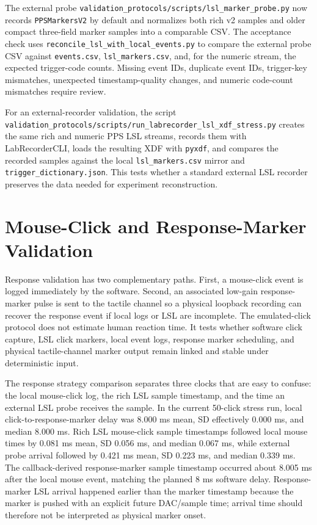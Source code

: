 \documentclass[11pt]{article}
\begin{document}
The external probe
\texttt{validation\_protocols/scripts/lsl\_marker\_probe.py} now records
\texttt{PPSMarkersV2} by default and normalizes both rich v2 samples and older
compact three-field marker samples into a comparable CSV. The acceptance check
uses \texttt{reconcile\_lsl\_with\_local\_events.py} to compare the external
probe CSV against \texttt{events.csv}, \texttt{lsl\_markers.csv}, and, for the
numeric stream, the expected trigger-code counts. Missing event IDs, duplicate
event IDs, trigger-key mismatches, unexpected timestamp-quality changes, and
numeric code-count mismatches require review.

For an external-recorder validation, the script
\texttt{validation\_protocols/scripts/run\_labrecorder\_lsl\_xdf\_stress.py}
creates the same rich and numeric PPS LSL streams, records them with
LabRecorderCLI, loads the resulting XDF with \texttt{pyxdf}, and compares the
recorded samples against the local \texttt{lsl\_markers.csv} mirror and
\texttt{trigger\_dictionary.json}. This tests whether a standard external LSL
recorder preserves the data needed for experiment reconstruction.

\section{Mouse-Click and Response-Marker Validation}

Response validation has two complementary paths. First, a mouse-click event is
logged immediately by the software. Second, an associated low-gain
response-marker pulse is sent to the tactile channel so a physical loopback
recording can recover the response event if local logs or LSL are incomplete.
The emulated-click protocol does not estimate human reaction time. It tests
whether software click capture, LSL click markers, local event logs, response
marker scheduling, and physical tactile-channel marker output remain linked
and stable under deterministic input.

The response strategy comparison separates three clocks that are easy to
confuse: the local mouse-click log, the rich LSL sample timestamp, and the time
an external LSL probe receives the sample. In the current 50-click stress run,
local click-to-response-marker delay was 8.000 ms mean, SD effectively 0.000
ms, and median 8.000 ms. Rich LSL mouse-click sample timestamps followed local
mouse times by 0.081 ms mean, SD 0.056 ms, and median 0.067 ms, while external
probe arrival followed by 0.421 ms mean, SD 0.223 ms, and median 0.339 ms. The
callback-derived response-marker sample timestamp occurred about 8.005 ms after
the local mouse event, matching the planned 8 ms software delay.
Response-marker LSL arrival happened earlier than the marker timestamp because
the marker is pushed with an explicit future DAC/sample time; arrival time
should therefore not be interpreted as physical marker onset.
\end{document}
